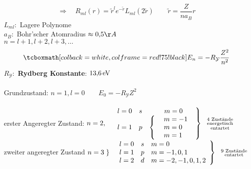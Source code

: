 \begin{enumerate}[(1)]
	\begin{equation*}
	\Rightarrow \quad R_{ml}(r) = \tilde{r}^l e^{-\tilde{r}} L_{ml}(2 \tilde{r}) \qquad \tilde{r} = \frac{Z}{n a_B} r
	\end{equation*}
	$ L_{ml} : $ Lagere Polynome\\
	$ a_B : $ Bohr'scher Atomradius $ \approx 0{,}5 \AA $\\[5pt]
	$ n = l+1, l+2, l+3, \dots $
	\begin{equation*}
	\rmbox{E_n = - R_{\mathcal{Y}} \frac{Z^2}{n^2}}
	\end{equation*}
	$ R_{\mathcal{Y}} : $ \textbf{Rydberg Konstante}: $ 13{,}6 \, \textrm{eV} $\\
	\\[5pt]
	Grundzustand: $ n=1, l=0 \qquad E_0 = - R_{\mathcal{Y}} Z^2 $\\
	\\[5pt]
	erster Angeregter Zustand:
	$ n = 2, \quad \left. \begin{array}{ccc}
	l=0 & s & \ \ \: m=0 \\
	l=1 & p & \left\{ \begin{array}{c}
	\phantom{-}m=-1\\
	m=0\\
	m=1
	\end{array} \right.
	\end{array} \right\} \ \ \substack{\textrm{4 Zustände} \\ \textrm{energetisch} \\ \textrm{entartet}} $\\[5pt]
	zweiter angeregter Zustand
	$ n = 3 \left. \right\} \ \ \left. \begin{array}{ccl}
	l=0 & s & m=0 \\
	l=1 & p & m=-1,0,1 \\
	l=2 & d & m=-2,-1,0,1,2
	\end{array} \right\} \ \ \substack{\textrm{9 Zustände} \\ \textrm{entartet}} $
\end{enumerate}
